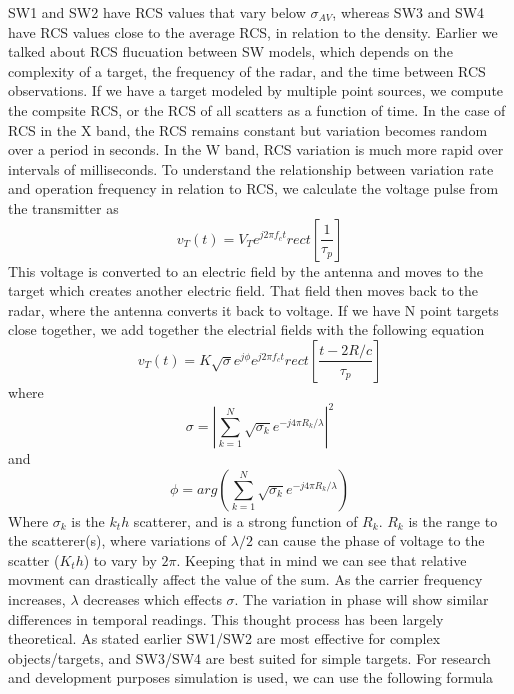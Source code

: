 \documentclass[12pt]{article}
\begin{document}
SW1 and SW2 have RCS values that vary below $\sigma_{AV}$, whereas SW3 and SW4 have RCS values close to the average RCS, in relation to the density. Earlier we talked about RCS flucuation between SW models, which depends on the complexity of a target, the frequency of the radar, and the time between RCS observations. If we have a target modeled by multiple point sources, we compute the compsite RCS, or the RCS of all scatters as a function of time. In the case of RCS in the X band, the RCS remains constant but variation becomes random over a period in seconds. In the W band, RCS variation is much more rapid over intervals of milliseconds. 
To understand the relationship between variation rate and operation frequency in relation to RCS, we calculate the voltage pulse from the transmitter as
\begin{equation}
    v_T(t) = V_T e^{j2\pi f_c t} rect \left[ \frac{1}{\tau_p} \right]
\end{equation}
This voltage is converted to an electric field by the antenna and moves to the target which creates another electric field. That field then moves back to the radar, where the antenna converts it back to voltage. If we have N point targets close together, we add together the electrial fields with the following equation
\begin{equation}
    v_T(t) = K \sqrt{\sigma} e^{j \phi} e^{j2\pi f_c t} rect \left[ \frac{t-2R/c}{\tau_p} \right]
\end{equation}
where
\begin{equation}
    \sigma = \left| \sum_{k=1}^{N} \sqrt{\sigma_k} e^{-j4 \pi R_k / \lambda }  \right| ^ 2
\end{equation}
and 
\begin{equation}
    \phi = arg \left( \sum_{k=1}^{N} \sqrt{\sigma_k} e^{-j4 \pi R_k / \lambda} \right)
\end{equation}
Where $\sigma_k$ is the $k_th$ scatterer, and is a strong function of $R_k$. $R_k$ is the range to the scatterer(s), where variations of $\lambda/2$ can cause the phase of voltage to the scatter ($K_th$) to vary by $2 \pi$. Keeping that in mind we can see that relative movment can drastically affect the value of the sum. As the carrier frequency increases, $\lambda$ decreases which effects $\sigma$. The variation in phase will show similar differences in temporal readings. This thought process has been largely theoretical. As stated earlier SW1/SW2 are most effective for complex objects/targets, and SW3/SW4 are best suited for simple targets. For research and development purposes simulation is used, we can use the following formula
\end{document}
